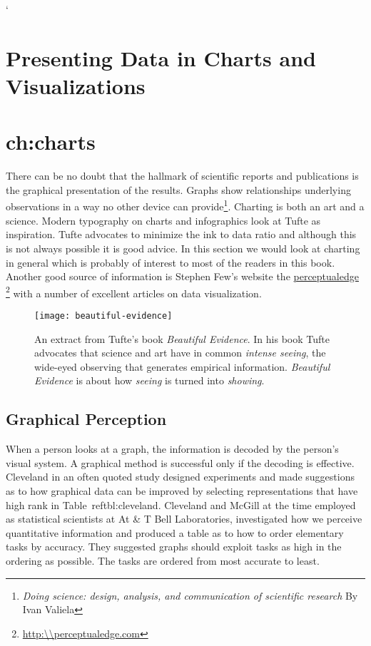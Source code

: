 `\chapter{Presenting Data in Charts and Visualizations}
\chapter{ch:charts}
\pagestyle{headings}

There can be no doubt that the hallmark of scientific reports and publications is the graphical presentation of the results. Graphs show relationships underlying observations in a way no other device can provide\footnote{\textit{Doing science: design, analysis, and communication of scientific research}
 By Ivan Valiela}.  Charting is both an art and a science. Modern typography on charts and infographics look at Tufte as inspiration.
Tufte advocates to minimize the ink to data ratio and although this is not always possible it is good advice.
In this section we would look at charting in general which is probably of interest to most of the readers
in this book.  Another good source of information is Stephen Few’s website the \href{perpetualedge}{perceptualedge} \footnote{\protect\url{http:\\perceptualedge.com}}  with a number of excellent articles on data visualization. 

\begin{figure}[htbp]
\texttt{[image: beautiful-evidence]}
\caption{An extract from Tufte’s book \textit{Beautiful Evidence}. In his book Tufte advocates that science and art have in common \emph{intense seeing}, the wide-eyed observing that generates empirical information. \textit{Beautiful Evidence} is about how \emph{seeing} is turned into \emph{showing}. \cite{Tufte2006}}
\end{figure}

\section{Graphical Perception}

When a person looks at a graph, the information is decoded by the person’s visual system. A graphical method is successful only if the decoding is effective. Cleveland \citeyearpar{cleveland1985} in an often quoted study designed experiments and made suggestions as to how graphical data can be improved by selecting representations that have high rank in Table~ref{tbl:cleveland}. Cleveland and McGill at the time employed as statistical scientists at At \& T Bell Laboratories, investigated how we perceive quantitative information and produced a table as to how to order elementary tasks by accuracy. They suggested graphs should exploit tasks as high in the ordering as possible. The tasks are ordered from most accurate to least.

